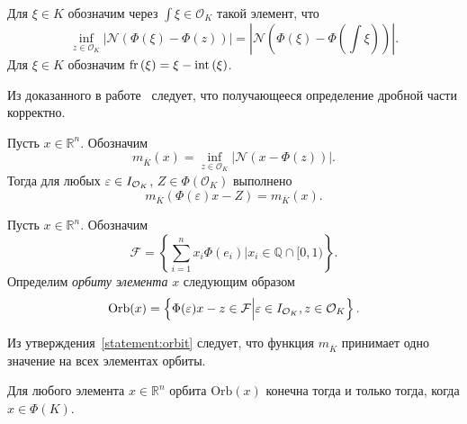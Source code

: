 \documentclass[_00_dissertation.tex]{subfiles}
\begin{document}
\begin{definition}
    Для $\xi \in K$ обозначим через $\int{\xi} \in \mathcal{O}_K$ такой элемент, что
    \begin{equation*}
        \inf\limits_{z\in\mathcal{O}_K} |\mathcal{N}(\Phi(\xi) - \Phi(z))| = |\mathcal{N}(\Phi(\xi) - \Phi(\int{\xi}))|.
    \end{equation*}
    Для $\xi \in K$ обозначим $\textrm{fr}\left(\xi\right) = \xi - \textrm{int}\left(\xi\right)$.
\end{definition}

Из доказанного в работе~\cite[с.~1400]{source:Lezowski} следует, что получающееся определение дробной части корректно.

\begin{statement}\label{statement:orbit} \cite[с.~1400]{source:Lezowski}
    Пусть $x \in \mathbb{R}^n$.
    Обозначим
    \begin{equation*}
        m_{\overline{K}}(x) = \inf_{z\in\mathcal{O}_K} |\mathcal{N}(x - \Phi(z))|.
    \end{equation*}
    Тогда для любых $\varepsilon \in I_{\mathcal{O}_K}$, $Z \in \Phi(\mathcal{O}_K)$ выполнено
    \begin{equation*}
        m_{\overline{K}}(\Phi(\varepsilon)x - Z) = m_{\overline{K}}(x).
    \end{equation*}
\end{statement}

\begin{definition}
    Пусть $x\in \mathbb{R}^n$.
    Обозначим
    \begin{equation*}
        \mathcal{F} = \left\{
            \sum\limits_{i=1}^n x_i\Phi(e_i) \Big| x_i \in \mathbb{Q}\cap[0, 1)
        \right\}.
    \end{equation*}
    Определим \emph{орбиту элемента} $x$ следующим образом 
    \begin{equation*}
        \textrm{Orb}(x) = \left\{
        \Phi(\varepsilon)x - z \in \mathcal{F} \Big| \varepsilon \in I_{\mathcal{O}_K}, z \in \mathcal{O}_K
    \right\}.
    \end{equation*}
\end{definition}

Из утверждения~\ref{statement:orbit} следует, что функция $m_{\overline{K}}$ принимает одно значение на всех элементах орбиты.

\begin{statement} \cite[с.~1403]{source:Lezowski}
    Для любого элемента $x\in \mathbb{R}^n$ орбита $\textrm{Orb}(x)$ конечна тогда и только тогда, когда $x \in \Phi(K)$.
\end{statement}
\end{document}
